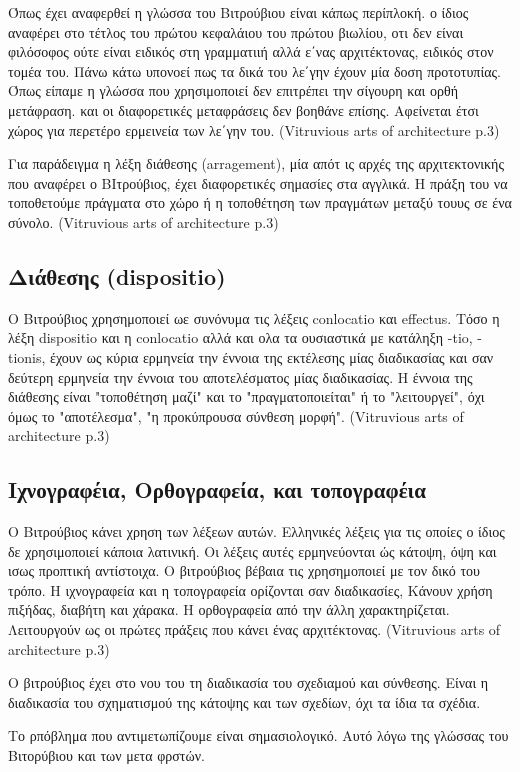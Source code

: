   Όπως έχει αναφερθεί η γλώσσα του Βιτρούβιου είναι κάπως περίπλοκή. ο ίδιος αναφέρει στο τέτλος του πρώτου κεφαλάιου του πρώτου βιωλίου, οτι δεν είναι φιλόσοφος ούτε είναι ειδικός στη γραμματιιή αλλά ε΄νας αρχιτέκτονας, ειδικός στον τομέα του. Πάνω κάτω υπονοεί πως τα δικά του λε΄γην έχουν μία δοση προτοτυπίας. Όπως είπαμε η γλώσσα που χρησιμοποιεί δεν επιτρέπει την σίγουρη και ορθή μετάφραση. και οι διαφορετικές μεταφράσεις δεν βοηθάνε επίσης. Αφείνεται έτσι χώρος για περετέρο ερμεινεία των λε΄γην του. (Vitruvious arts of architecture p.3)
  
  Για παράδειγμα η λέξη διάθεσης (arragement), μία απότ ις αρχές της αρχιτεκτονικής που αναφέρει ο ΒΙτρούβιος, έχει διαφορετικές σημασίες στα αγγλικά. Η πράξη του να τοποθετούμε πράγματα στο χώρο ή η τοποθέτηση των πραγμάτων μεταξύ τουυς σε ένα σύνολο. (Vitruvious arts of architecture p.3)  
  
\subsection{Διάθεσης (dispositio)}
  
  Ο Βιτρούβιος χρησημοποιεί ωε συνόνυμα τις λέξεις conlocatio και effectus. Τόσο η λέξη dispositio και η conlocatio αλλά και ολα τα ουσιαστικά με κατάληξη -tio, -tionis, έχουν ως κύρια ερμηνεία την έννοια της εκτέλεσης μίας διαδικασίας και σαν δεύτερη ερμηνεία την έννοια του αποτελέσματος μίας διαδικασίας. Η έννοια της διάθεσης είναι "τοποθέτηση μαζί" και το "πραγματοποιείται" ή το "λειτουργεί", όχι όμως το "αποτέλεσμα", "η προκύπρουσα σύνθεση μορφή". (Vitruvious arts of architecture p.3)
  
\subsection{Ιχνογραφέια, Ορθογραφεία, και τοπογραφέια}
  
  Ο Βιτρούβιος κάνει χρηση των λέξεων αυτών. Ελληνικές λέξεις για τις οποίες ο ίδιος δε χρησιμοποιεί κάποια λατινική. Οι λέξεις αυτές ερμηνεύονται ώς κάτοψη, όψη και ισως προπτική αντίστοιχα. Ο βιτρούβιος βέβαια τις χρησημοποιεί με τον δικό του τρόπο. Η ιχνογραφεία και η τοπογραφεία ορίζονται σαν διαδικασίες, Κάνουν χρήση πιξήδας, διαβήτη και χάρακα. Η ορθογραφεία από την άλλη χαρακτηρίζεται. Λειτουργούν ως οι πρώτες πράξεις που κάνει ένας αρχιτέκτονας. (Vitruvious arts of architecture p.3)
  
  Ο βιτρούβιος έχει στο νου του τη διαδικασία του σχεδιαμού και σύνθεσης. Είναι η διαδικασία του σχηματισμού της κάτοψης και των σχεδίων, όχι τα ίδια τα σχέδια.
  
  Το ρπόβλημα που αντιμετωπίζουμε είναι σημασιολογικό. Αυτό λόγω της γλώσσας του Βιτορύβιου και των μετα φρστών. 